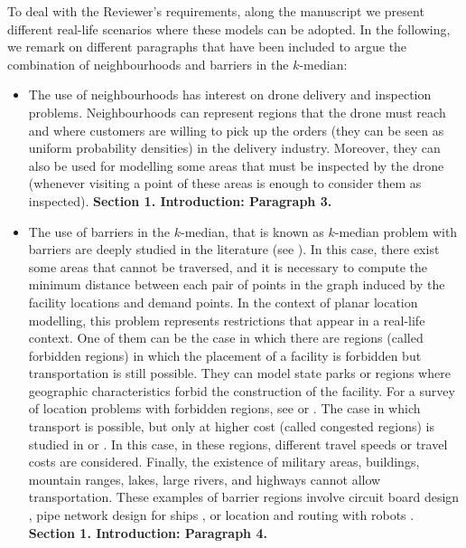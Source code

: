 \documentclass{article}
\newenvironment{reviewer}{\setcounter{pointcounter}{1}}{}
\newcommand{\point}{\text{{\selectfont \thepointcounter} \stepcounter{pointcounter}}}
\begin{document}
\begin{reviewer}
		\begin{tcolorbox}[breakable,enhanced,coltitle=black,colback=red!5!white,colframe=red!75!black,title=\textbf{Answer R1.\point},borderline={1pt}{0pt}{black},boxrule=0pt]
			To deal with the Reviewer's requirements, along the manuscript we present different real-life scenarios where these models can be adopted. In the following, we remark on different paragraphs that have been included to argue the combination of neighbourhoods and barriers in the $k$-median:
			\begin{itemize}
				\item The use of neighbourhoods has interest on drone delivery and inspection problems. Neighbourhoods can represent regions that the drone must reach and where customers are willing to pick up the orders (they can be seen as uniform probability densities) in the delivery industry. Moreover, they can also be used for modelling some areas that must be inspected by the drone (whenever visiting a point of these areas is enough to consider them as inspected). \textbf{Section 1. Introduction: Paragraph 3.}
				\item The use of barriers in the $k$-median, that is known as $k$-median problem with barriers are deeply studied in the literature (see \cite{klamroth2002}). In this case, there exist some areas that cannot be traversed, and it is necessary to compute the minimum distance between each pair of points in the graph induced by the facility locations and demand points. In the context of planar location modelling, this problem represents restrictions that appear in a real-life context. One of them can be the case in which there are regions (called forbidden regions) in which the placement of a facility is forbidden but transportation is still possible. They can model state parks or regions where geographic characteristics forbid the construction of the facility. For a survey of location problems with forbidden regions, see \cite{hamacher1995} or \cite{nickel1995}. The case in which transport is possible, but only at higher cost (called congested regions) is studied in \cite{butt1996} or \cite{mitchell1991}. In this case, in these regions, different travel speeds or travel costs are considered. Finally, the existence of military areas, buildings, mountain ranges, lakes, large rivers, and highways cannot allow transportation. These examples of barrier regions involve circuit board design \citep{lapaugh1980}, pipe network design for ships \citep{wangdahl1974}, or location and routing with robots \citep{lozano-perez1979, blanco2022}. \textbf{Section 1. Introduction: Paragraph 4.}

\end{itemize}
\end{tcolorbox}
\end{reviewer}
\end{document}
